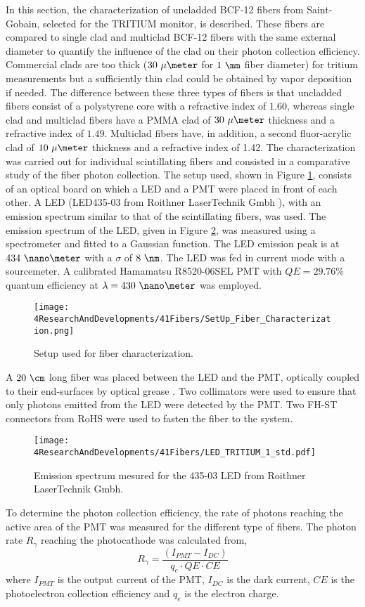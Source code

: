 In this section, the characterization of uncladded BCF-12 fibers from Saint-Gobain, selected for the TRITIUM monitor, is described. These fibers are compared to single clad and multiclad BCF-12 fibers with the same external diameter to quantify the influence of the clad on their photon collection efficiency. Commercial clads are too thick ($30~\mu\meter$ for $1~\mm$ fiber diameter) for tritium measurements but a sufficiently thin clad could be obtained by vapor deposition if needed. The difference between these three types of fibers is that uncladded fibers consist of a polystyrene core with a refractive index of $1.60$, whereas single clad and multiclad fibers have a PMMA clad of $30~\mu\meter$ thickness and a refractive index of $1.49$. Multiclad fibers have, in addition, a second fluor-acrylic clad of $10~\mu\meter$ thickness and a refractive index of 1.42. The characterization was carried out for individual scintillating fibers and consisted in a comparative study of the fiber photon collection. The setup used, shown in Figure \ref{fig:SetUpFiberCharacterization}, consists of an optical board on which a LED and a PMT were placed in front of each other. A LED (LED435-03 from Roithner LaserTechnik Gmbh \cite{LEDRLT}), with an emission spectrum similar to that of the scintillating fibers, was used. The emission spectrum of the LED, given in Figure \ref{fig:LEDSpectrumTritium}, was measured using a spectrometer and fitted to a Gaussian function. The LED emission peak is at $434~\nano\meter$ with a $\sigma$ of $8~\nm$. The LED was fed in current mode with a sourcemeter. A calibrated Hamamatsu R8520-06SEL PMT with $QE=29.76\%$ quantum efficiency at $\lambda=430~\nano\meter$ was employed. 
\begin{figure}[h]
\centering
\texttt{[image: 4ResearchAndDevelopments/41Fibers/SetUp\_Fiber\_Characterization.png]}
\caption{Setup used for fiber characterization.\label{fig:SetUpFiberCharacterization}}
\end{figure}
A $20~\cm$ long fiber was placed between the LED and the PMT, optically coupled to their end-surfaces by optical grease \cite{OpticalGrease}. Two collimators were used to ensure that only photons emitted from the LED were detected by the PMT. Two FH-ST connectors from RoHS \cite{} were used to fasten the fiber to the system. 
\begin{figure}[h]
\centering
\texttt{[image: 4ResearchAndDevelopments/41Fibers/LED\_TRITIUM\_1\_std.pdf]}
\caption{Emission spectrum mesured for the 435-03 LED from Roithner LaserTechnik Gmbh.\label{fig:LEDSpectrumTritium}}
\end{figure}
To determine the photon collection efficiency, the rate of photons reaching the active area of the PMT was measured for the different type of fibers. The photon rate $R_{\gamma}$ reaching the photocathode was calculated from,
\begin{equation}
R_{\gamma} = \frac{\left( I_{PMT} - I_{DC} \right)}{q_e \cdot{} QE \cdot{} CE}
\label{eq:NumPhotonsFromIntensityPMT}
\end{equation}
where $I_{PMT}$ is the output current of the PMT, $I_{DC}$ is the dark current, $CE$ is the photoelectron collection efficiency and $q_e$ is the electron charge.